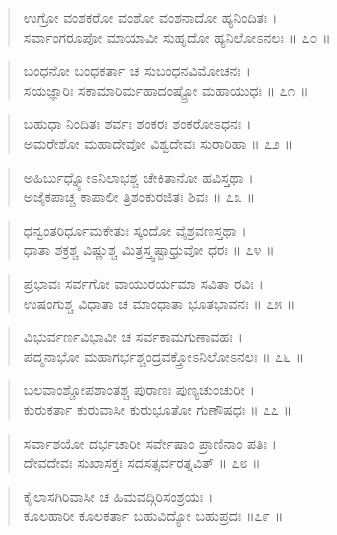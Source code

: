 \begin{verse}
ಉಗ್ರೋ ವಂಶಕರೋ ವಂಶೋ ವಂಶನಾದೋ ಹ್ಯನಿಂದಿತಃ ।\\ಸರ್ವಾಂಗರೂಪೋ ಮಾಯಾವೀ ಸುಹೃದೋ ಹ್ಯನಿಲೋಽನಲಃ \num{॥ ೭೦ ॥}
\end{verse}

\begin{verse}
ಬಂಧನೋ ಬಂಧಕರ್ತಾ ಚ ಸುಬಂಧನವಿಮೋಚನಃ ।\\ಸಯಜ್ಞಾರಿಃ ಸಕಾಮಾರಿರ್ಮಹಾದಂಷ್ಟ್ರೋ ಮಹಾಯುಧಃ \num{॥ ೭೧ ॥}
\end{verse}

\begin{verse}
ಬಹುಧಾ ನಿಂದಿತಃ ಶರ್ವಃ ಶಂಕರಃ ಶಂಕರೋಽಧನಃ ।\\ಅಮರೇಶೋ ಮಹಾದೇವೋ ವಿಶ್ವದೇವಃ ಸುರಾರಿಹಾ \num{॥ ೭೨ ॥}
\end{verse}

\begin{verse}
ಅಹಿರ್ಬುಧ್ನ್ಯೋಽನಿಲಾಭಶ್ಚ ಚೇಕಿತಾನೋ ಹವಿಸ್ತಥಾ ।\\ಅಜೈಕಪಾಚ್ಚ ಕಾಪಾಲೀ ತ್ರಿಶಂಕುರಜಿತಃ ಶಿವಃ \num{॥ ೭೩ ॥}
\end{verse}

\begin{verse}
ಧನ್ವಂತರಿರ್ಧೂಮಕೇತುಃ ಸ್ಕಂದೋ ವೈಶ್ರವಣಸ್ತಥಾ ।\\ಧಾತಾ ಶಕ್ರಶ್ಚ ವಿಷ್ಣುಶ್ಚ ಮಿತ್ರಸ್ತ್ವಷ್ಟಾಧ್ರುವೋ ಧರಃ \num{॥ ೭೪ ॥}
\end{verse}

\begin{verse}
ಪ್ರಭಾವಃ ಸರ್ವಗೋ ವಾಯುರರ್ಯಮಾ ಸವಿತಾ ರವಿಃ ।\\ಉಷಂಗುಶ್ಚ ವಿಧಾತಾ ಚ ಮಾಂಧಾತಾ ಭೂತಭಾವನಃ \num{॥ ೭೫ ॥}
\end{verse}

\begin{verse}
ವಿಭುರ್ವರ್ಣವಿಭಾವೀ ಚ ಸರ್ವಕಾಮಗುಣಾವಹಃ ।\\ಪದ್ಮನಾಭೋ ಮಹಾಗರ್ಭಶ್ಚಂದ್ರವಕ್ತ್ರೋಽನಿಲೋಽನಲಃ \num{॥ ೭೬ ॥}
\end{verse}

\begin{verse}
ಬಲವಾಂಶ್ಚೋಪಶಾಂತಶ್ಚ ಪುರಾಣಃ ಪುಣ್ಯಚುಂಚುರೀ ।\\ಕುರುಕರ್ತಾ ಕುರುವಾಸೀ ಕುರುಭೂತೋ ಗುಣೌಷಧಃ \num{॥ ೭೭ ॥}
\end{verse}

\begin{verse}
ಸರ್ವಾಶಯೋ ದರ್ಭಚಾರೀ ಸರ್ವೇಷಾಂ ಪ್ರಾಣಿನಾಂ ಪತಿಃ ।\\ದೇವದೇವಃ ಸುಖಾಸಕ್ತಃ ಸದಸತ್ಸರ್ವರತ್ನವಿತ್ \num{॥ ೭೮ ॥}
\end{verse}

\begin{verse}
ಕೈಲಾಸಗಿರಿವಾಸೀ ಚ ಹಿಮವದ್ಗಿರಿಸಂಶ್ರಯಃ ।\\ಕೂಲಹಾರೀ ಕೂಲಕರ್ತಾ ಬಹುವಿದ್ಯೋ ಬಹುಪ್ರದಃ \num{॥೭೯ ॥}
\end{verse}

